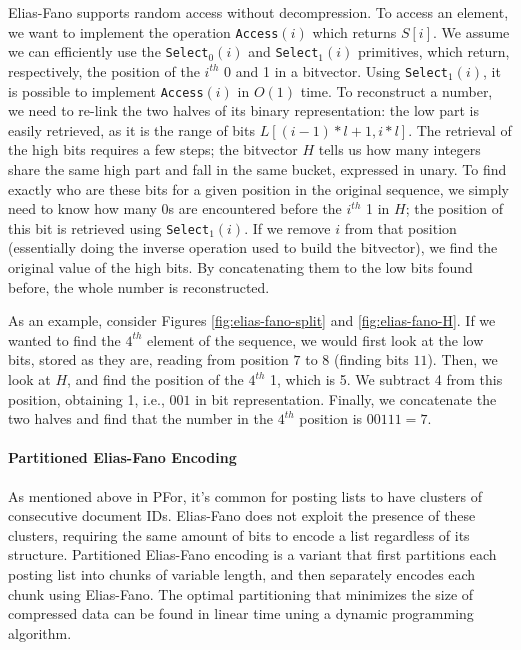 Elias-Fano supports random access without decompression. To access an element, we want to implement the operation \texttt{Access}$(i)$ which returns $S[i]$. We assume we can efficiently use the \texttt{Select$_0$}$(i)$ and  \texttt{Select$_1$}$(i)$ primitives, which return, respectively, the position of the $i^{th}$ 0 and 1 in a bitvector. Using \texttt{Select$_1$}$(i)$, it is possible to implement \texttt{Access}$(i)$ in $O(1)$ time. To reconstruct a number, we need to re-link the two halves of its binary representation: the low part is easily retrieved, as it is the range of bits $L[(i-1) * l + 1, i * l]$. The retrieval of the high bits requires a few steps; the bitvector $H$ tells us how many integers share the same high part and fall in the same bucket, expressed in unary. To find exactly who are these bits for a given position in the original sequence, we simply need to know how many 0s are encountered before the $i^{th}$ 1 in $H$; the position of this bit is retrieved using \texttt{Select$_1$}$(i)$. If we remove $i$ from that position (essentially doing the inverse operation used to build the bitvector), we find the original value of the high bits. By concatenating them to the low bits found before, the whole number is reconstructed.

As an example, consider Figures \ref{fig:elias-fano-split} and \ref{fig:elias-fano-H}. If we wanted to find the $4^{th}$ element of the sequence, we would first look at the low bits, stored as they are, reading from position $7$ to $8$ (finding bits $11$). Then, we look at $H$, and find the position of the $4^{th}$ 1, which is 5. We subtract 4 from this position, obtaining 1, i.e., $001$ in bit representation. Finally, we concatenate the two halves and find that the number in the $4^{th}$ position is $00111 = 7$.

\paragraph{Partitioned Elias-Fano Encoding}

As mentioned above in PFor, it's common for posting lists to have clusters of consecutive document IDs. Elias-Fano does not exploit the presence of these clusters, requiring the same amount of bits to encode a list regardless of its structure. Partitioned Elias-Fano encoding is a variant that first partitions each posting list into chunks of variable length, and then separately encodes each chunk using Elias-Fano. The optimal partitioning that minimizes the size of compressed data can be found in linear time uning a dynamic programming algorithm.
